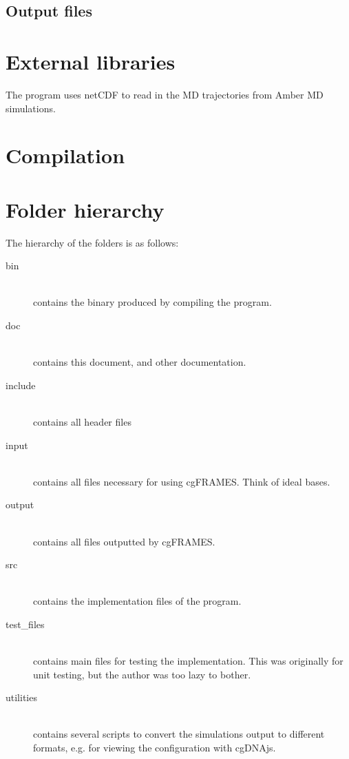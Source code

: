 \documentclass[a4paper,11pt]{scrartcl}
\begin{document}
\subsection{Output files}

\section{External libraries}

The program uses netCDF to read in the MD trajectories from Amber MD simulations.

\section{Compilation}

\section{Folder hierarchy}

The hierarchy of the folders is as follows:
\begin{description}
    \item[bin] \hfill \\ contains the binary produced by compiling the program. 
    \item[doc] \hfill \\ contains this document, and other documentation.
    \item[include] \hfill \\ contains all header files
    \item[input] \hfill \\ contains all files necessary for using cgFRAMES. Think of ideal bases.
    \item[output] \hfill \\ contains all files outputted by cgFRAMES.
    \item[src] \hfill \\ contains the implementation files of the program.
    \item[test\_files] \hfill \\ contains main files for testing the implementation. This was originally for unit testing, but the author was too lazy to bother.
    \item[utilities] \hfill \\ contains several scripts to convert the simulations output to different formats, e.g. for viewing the configuration with cgDNAjs.
\end{description}
\end{document}
